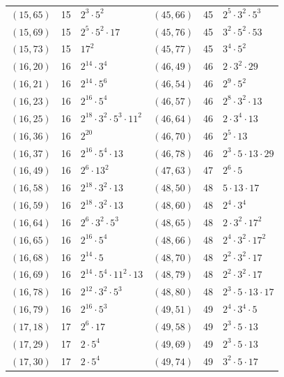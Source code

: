\documentclass[11pt]{article}
\begin{document}
\begin{longtable}{@{}lrl@{\qquad}lrl@{}}
$(15,65)$ & 15 & $2^{3}\cdot 5^{2}$ & $(45,66)$ & 45 & $2^{5}\cdot 3^{2}\cdot 5^{3}$\\
$(15,69)$ & 15 & $2^{5}\cdot 5^{2}\cdot 17$ & $(45,76)$ & 45 & $3^{2}\cdot 5^{2}\cdot 53$\\
$(15,73)$ & 15 & $17^{2}$ & $(45,77)$ & 45 & $3^{4}\cdot 5^{2}$\\
$(16,20)$ & 16 & $2^{14}\cdot 3^{4}$ & $(46,49)$ & 46 & $2\cdot 3^{2}\cdot 29$\\
$(16,21)$ & 16 & $2^{14}\cdot 5^{6}$ & $(46,54)$ & 46 & $2^{9}\cdot 5^{2}$\\
$(16,23)$ & 16 & $2^{16}\cdot 5^{4}$ & $(46,57)$ & 46 & $2^{8}\cdot 3^{2}\cdot 13$\\
$(16,25)$ & 16 & $2^{18}\cdot 3^{2}\cdot 5^{3}\cdot 11^{2}$ & $(46,64)$ & 46 & $2\cdot 3^{4}\cdot 13$\\
$(16,36)$ & 16 & $2^{20}$ & $(46,70)$ & 46 & $2^{5}\cdot 13$\\
$(16,37)$ & 16 & $2^{16}\cdot 5^{4}\cdot 13$ & $(46,78)$ & 46 & $2^{3}\cdot 5\cdot 13\cdot 29$\\
$(16,49)$ & 16 & $2^{6}\cdot 13^{2}$ & $(47,63)$ & 47 & $2^{6}\cdot 5$\\
$(16,58)$ & 16 & $2^{18}\cdot 3^{2}\cdot 13$ & $(48,50)$ & 48 & $5\cdot 13\cdot 17$\\
$(16,59)$ & 16 & $2^{18}\cdot 3^{2}\cdot 13$ & $(48,60)$ & 48 & $2^{4}\cdot 3^{4}$\\
$(16,64)$ & 16 & $2^{6}\cdot 3^{2}\cdot 5^{3}$ & $(48,65)$ & 48 & $2\cdot 3^{2}\cdot 17^{2}$\\
$(16,65)$ & 16 & $2^{16}\cdot 5^{4}$ & $(48,66)$ & 48 & $2^{4}\cdot 3^{2}\cdot 17^{2}$\\
$(16,68)$ & 16 & $2^{14}\cdot 5$ & $(48,70)$ & 48 & $2^{2}\cdot 3^{2}\cdot 17$\\
$(16,69)$ & 16 & $2^{14}\cdot 5^{4}\cdot 11^{2}\cdot 13$ & $(48,79)$ & 48 & $2^{2}\cdot 3^{2}\cdot 17$\\
$(16,78)$ & 16 & $2^{12}\cdot 3^{2}\cdot 5^{3}$ & $(48,80)$ & 48 & $2^{3}\cdot 5\cdot 13\cdot 17$\\
$(16,79)$ & 16 & $2^{16}\cdot 5^{3}$ & $(49,51)$ & 49 & $2^{4}\cdot 3^{4}\cdot 5$\\
$(17,18)$ & 17 & $2^{6}\cdot 17$ & $(49,58)$ & 49 & $2^{3}\cdot 5\cdot 13$\\
$(17,29)$ & 17 & $2\cdot 5^{4}$ & $(49,69)$ & 49 & $2^{3}\cdot 5\cdot 13$\\
$(17,30)$ & 17 & $2\cdot 5^{4}$ & $(49,74)$ & 49 & $3^{2}\cdot 5\cdot 17$\\

\end{longtable}
\end{document}
